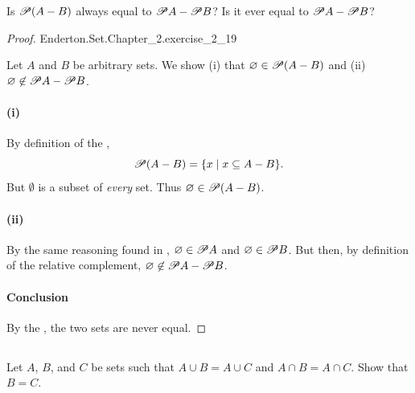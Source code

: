 \documentclass{report}
\begin{document}
Is $\mathscr{P}(A - B)$ always equal to $\mathscr{P}A - \mathscr{P}B$?
Is it ever equal to $\mathscr{P}A - \mathscr{P}B$?

\begin{proof}

    {Enderton.Set.Chapter\_2.exercise\_2\_19}

  Let $A$ and $B$ be arbitrary sets.
  We show (i) that $\varnothing \in \mathscr{P}(A - B)$ and (ii)
    $\varnothing \not\in \mathscr{P}A - \mathscr{P}B$.

  \paragraph{(i)}%

    By definition of the ,
      $$\mathscr{P}(A - B) = \{ x \mid x \subseteq A - B \}.$$
    But $\emptyset$ is a subset of \textit{every} set.
    Thus $\varnothing \in \mathscr{P}(A - B)$.

  \paragraph{(ii)}%

    By the same reasoning found in ,
      $\varnothing \in \mathscr{P}A$ and $\varnothing \in \mathscr{P}B$.
    But then, by definition of the relative complement,
      $\varnothing \not\in \mathscr{P}A - \mathscr{P}B$.

  \paragraph{Conclusion}%

    By the , the two sets are never equal.

\end{proof}

\subsection{}%

Let $A$, $B$, and $C$ be sets such that $A \cup B = A \cup C$ and
  $A \cap B = A \cap C$.
Show that $B = C$.
\end{document}
